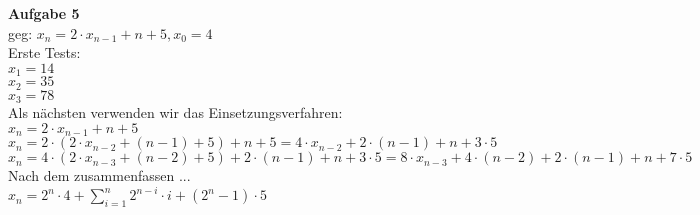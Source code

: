 \documentclass[a4paper]{scrartcl}
\begin{document}
	\begin{flushleft}
		\textbf{Aufgabe 5}\\
		geg: $x_n=2\cdot x_{n-1}+n+5, x_0=4$\\
		Erste Tests:\\
		$x_1=14$\\
		$x_2=35$\\
		$x_3=78$\\
		Als nächsten verwenden wir das Einsetzungsverfahren:\\
		$x_n=2\cdot x_{n-1}+n+5$\\
		$x_n=2\cdot(2\cdot x_{n-2}+(n-1)+5)+n+5=4\cdot x_{n-2}+2\cdot(n-1)+n+3\cdot 5$\\
		$x_n=4\cdot(2\cdot x_{n-3}+(n-2)+5)+2\cdot(n-1)+n+3\cdot 5=8\cdot x_{n-3}+4\cdot(n-2)+2\cdot(n-1)+n+7\cdot 5$\\
		Nach dem zusammenfassen ...\\
		$x_n=2^n\cdot 4+\sum\limits_{i=1}^{n}2^{n-i}\cdot i+(2^n-1)\cdot 5$
	\end{flushleft}
\end{document}
